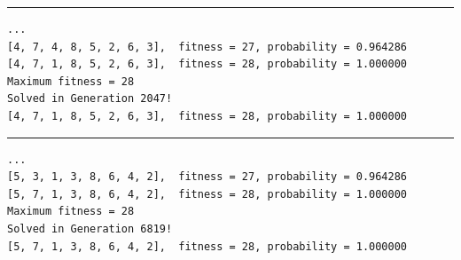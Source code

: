 \documentclass[12pt, twoside]{article}
\begin{document}
\rule{2in}{0.1pt}
\begin{verbatim}
...
[4, 7, 4, 8, 5, 2, 6, 3],  fitness = 27, probability = 0.964286
[4, 7, 1, 8, 5, 2, 6, 3],  fitness = 28, probability = 1.000000
Maximum fitness = 28
Solved in Generation 2047!
[4, 7, 1, 8, 5, 2, 6, 3],  fitness = 28, probability = 1.000000
\end{verbatim}
\rule{2in}{0.1pt}
\begin{verbatim}
...
[5, 3, 1, 3, 8, 6, 4, 2],  fitness = 27, probability = 0.964286
[5, 7, 1, 3, 8, 6, 4, 2],  fitness = 28, probability = 1.000000
Maximum fitness = 28
Solved in Generation 6819!
[5, 7, 1, 3, 8, 6, 4, 2],  fitness = 28, probability = 1.000000
\end{verbatim}
\end{document}
